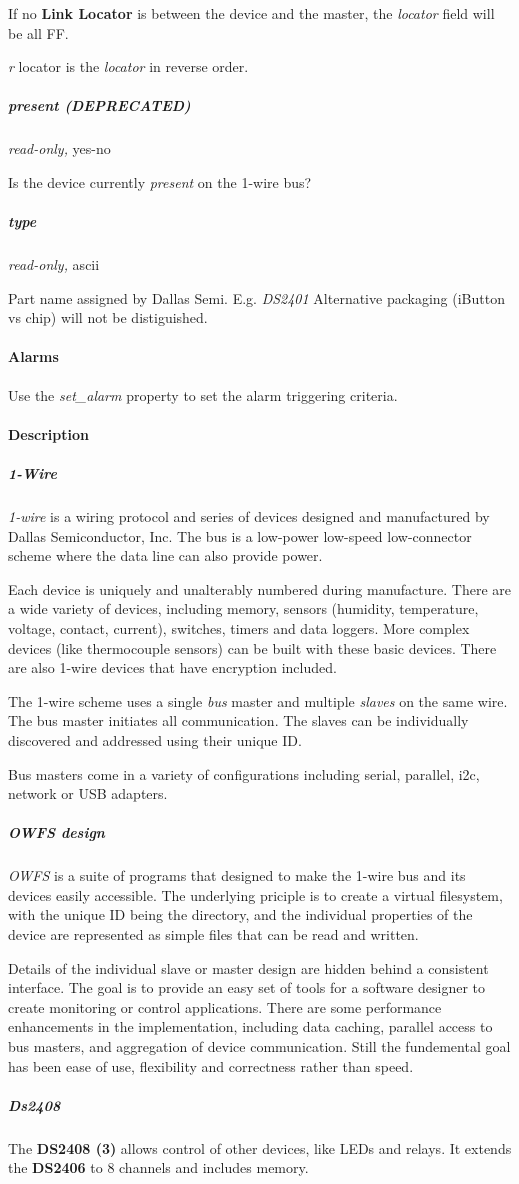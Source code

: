 If no \textbf{Link Locator} is between the device and the master, the \textit{locator} field
will be all FF. 

\textit{r} locator is the \textit{locator} in reverse order. 
\subparagraph*{present (DEPRECATED)}\textit{read-only,}
yes-no 

Is the device currently \textit{present} on the 1-wire bus? 
\subparagraph*{type}\textit{read-only,} ascii 

Part name assigned by Dallas Semi. E.g. \textit{DS2401} Alternative packaging (iButton
vs chip) will not be distiguished.  
\paragraph*{Alarms}
Use the \textit{set\_alarm} property to
set the alarm triggering criteria. 
\paragraph*{Description}
          
\subparagraph*{1-Wire}\textit{1-wire}  is a
wiring protocol and series of devices designed and manufactured by Dallas
Semiconductor, Inc. The bus is a low-power low-speed low-connector scheme where
the data line can also provide power. 

Each device is uniquely and unalterably
numbered during manufacture. There are a wide variety of devices, including
memory, sensors (humidity, temperature, voltage, contact, current), switches,
timers and data loggers. More complex devices (like thermocouple sensors)
can be built with these basic devices. There are also 1-wire devices that
have encryption included. 

The 1-wire scheme uses a single  \textit{bus} master and
multiple \textit{slaves} on the same wire. The bus master initiates all communication.
The slaves can be  individually discovered and addressed using their unique
ID. 

Bus masters come in a variety of configurations including serial, parallel,
i2c, network or USB adapters. 
\subparagraph*{OWFS design}\textit{OWFS} is a suite of programs that
designed to make the 1-wire bus and its devices easily accessible. The underlying
priciple is to create a virtual filesystem, with the unique ID being the
directory, and the individual properties of the device are represented
as simple files that can be read and written. 

Details of the individual
slave or master design are hidden behind a consistent interface. The goal
is to  provide an easy set of tools for a software designer to create monitoring
or control applications. There  are some performance enhancements in the
implementation, including data caching, parallel access to bus  masters,
and aggregation of device communication. Still the fundemental goal has
been ease of use, flexibility  and correctness rather than speed.  
\subparagraph*{Ds2408}The
\textsf{\textbf{DS2408 (3)}} allows control of other devices, like LEDs and relays. It extends
the \textbf{DS2406} to 8 channels and includes memory. 

